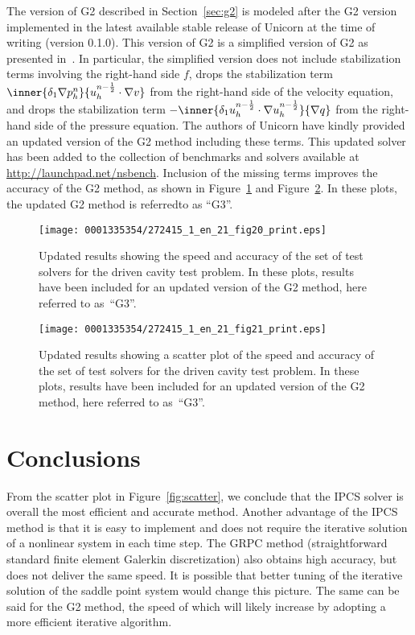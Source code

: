 The version of G2 described in Section~\ref{sec:g2} is modeled after
the G2 version implemented in the latest available stable release of
Unicorn at the time of writing (version 0.1.0). This version of G2 is
a simplified version of G2 as presented in~\citet{HoffmanJohnson2007}.
In particular, the simplified version does not include stabilization
terms involving the right-hand side $f$, drops the stabilization term
$\inner{\delta_1 \nabla p_h^n}{u_h^{n-\frac{1}{2}} \cdot \nabla v}$
from the right-hand side of the velocity equation, and drops the
stabilization term $- \inner{\delta_1 u_h^{n-\frac{1}{2}} \cdot \nabla
  u_h^{n-\frac{1}{2}}}{\nabla q}$ from the right-hand side of the
pressure equation. The authors of Unicorn have kindly provided an
updated version of the G2 method including these terms. This updated
solver has been added to the collection of benchmarks and solvers
available at \url{http://launchpad.net/nsbench}. Inclusion of the
missing terms improves the accuracy of the G2 method, as shown in
Figure~\ref{fig:g3plots} and Figure~\ref{fig:g3scatter}. In these
plots, the updated G2 method is referred\break to as ``G3''.

\begin{figure}[!t]
\centering
\texttt{[image: 0001335354/272415\_1\_en\_21\_fig20\_print.eps]}
\caption{Updated results showing the speed and accuracy of the set
      of test solvers for the driven cavity test problem. In these
      plots, results have been included for an updated version of the
      G2 method, here referred to as~``G3''.}
\label{fig:g3plots}\vspace*{10pt}
\end{figure}

\begin{figure}[!t]
\centering
\texttt{[image: 0001335354/272415\_1\_en\_21\_fig21\_print.eps]}
\caption{Updated results showing a scatter plot of the speed and
      accuracy of the set of test solvers for the driven cavity test
      problem. In these plots, results have been included for an
      updated version of the G2 method, here referred to as~``G3''.}
\label{fig:g3scatter}
\end{figure}

\section{Conclusions}

From the scatter plot in Figure~\ref{fig:scatter}, we conclude that
the IPCS solver is overall the most efficient and accurate
method. Another advantage of the IPCS method is that it is easy to
implement and does not require the iterative solution of a nonlinear
system in each time step. The GRPC method (straightforward standard
finite element Galerkin discretization) also obtains high accuracy,
but does not deliver the same speed. It is possible that better tuning
of the iterative solution of the saddle point system would change this
picture. The same can be said for the G2 method, the speed of which
will likely increase by adopting a more efficient iterative algorithm.

